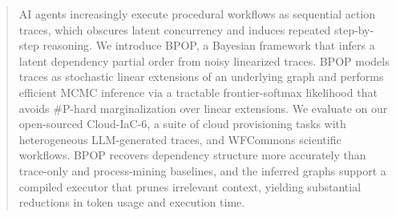 \documentclass{article}
\theoremstyle{plain}
\theoremstyle{definition}
\theoremstyle{remark}
\begin{document}

\printAffiliationsAndNotice{}  %

\begin{abstract}
AI agents increasingly execute procedural workflows as sequential action traces, which obscures latent concurrency and induces repeated step-by-step reasoning. We introduce BPOP, a Bayesian framework that infers a latent dependency partial order from noisy linearized traces. BPOP models traces as stochastic linear extensions of an underlying graph and performs efficient MCMC inference via a tractable frontier-softmax likelihood that avoids \#P-hard marginalization over linear extensions. We evaluate on our open-sourced Cloud-IaC-6, a suite of cloud provisioning tasks with heterogeneous LLM-generated traces, and WFCommons scientific workflows. BPOP recovers dependency structure more accurately than trace-only and process-mining baselines, and the inferred graphs support a compiled executor that prunes irrelevant context, yielding substantial reductions in token usage and execution time.

\end{abstract}

\end{document}
